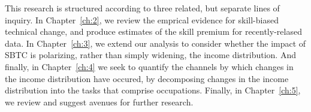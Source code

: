 This research is structured according to three related, but separate lines of inquiry. In Chapter~\ref{ch:2}, we review the emprical evidence for skill-biased technical change, and produce estimates of the skill premium for recently-relased data. In Chapter~\ref{ch:3}, we extend our analysis to consider whether the impact of SBTC is polarizing, rather than simply widening, the income distribution. And finally, in Chapter~\ref{ch:4} we seek to quantify the channels by which changes in the income distribution have occured, by  decomposing changes in the income distribution into the tasks that comprise occupations. Finally, in Chapter~\ref{ch:5}, we review and suggest avenues for further research.

